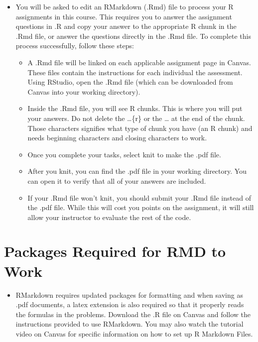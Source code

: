 \documentclass[
  letterpaper,
  DIV=11,
  numbers=noendperiod]{scrreprt}
\providecommand{\tightlist}{%
  \setlength{\itemsep}{0pt}\setlength{\parskip}{0pt}}\usepackage{longtable,booktabs,array}
\begin{document}
\begin{itemize}
\item
  You will be asked to edit an RMarkdown (.Rmd) file to process your R
  assignments in this course. This requires you to answer the assignment
  questions in .R and copy your answer to the appropriate R chunk in the
  .Rmd file, or answer the questions directly in the .Rmd file. To
  complete this process successfully, follow these steps:

  \begin{itemize}
  \tightlist
  \item
    A .Rmd file will be linked on each applicable assignment page in
    Canvas. These files contain the instructions for each individual the
    assessment. Using RStudio, open the .Rmd file (which can be
    downloaded from Canvas into your working directory).
  \item
    Inside the .Rmd file, you will see R chunks. This is where you will
    put your answers. Do not delete the \ldots\{r\} or the \ldots{} at
    the end of the chunk. Those characters signifies what type of chunk
    you have (an R chunk) and needs beginning characters and closing
    characters to work.
  \item
    Once you complete your tasks, select knit to make the .pdf file.
  \item
    After you knit, you can find the .pdf file in your working
    directory. You can open it to verify that all of your answers are
    included.
  \item
    If your .Rmd file won't knit, you should submit your .Rmd file
    instead of the .pdf file. While this will cost you points on the
    assignment, it will still allow your instructor to evaluate the rest
    of the code.
  \end{itemize}
\end{itemize}

\section{Packages Required for RMD to
Work}\label{packages-required-for-rmd-to-work}

\begin{itemize}
\tightlist
\item
  RMarkdown requires updated packages for formatting and when saving as
  .pdf documents, a latex extension is also required so that it properly
  reads the formulas in the problems. Download the .R file on Canvas and
  follow the instructions provided to use RMarkdown. You may also watch
  the tutorial video on Canvas for specific information on how to set up
  R Markdown Files.
\end{itemize}
\end{document}
